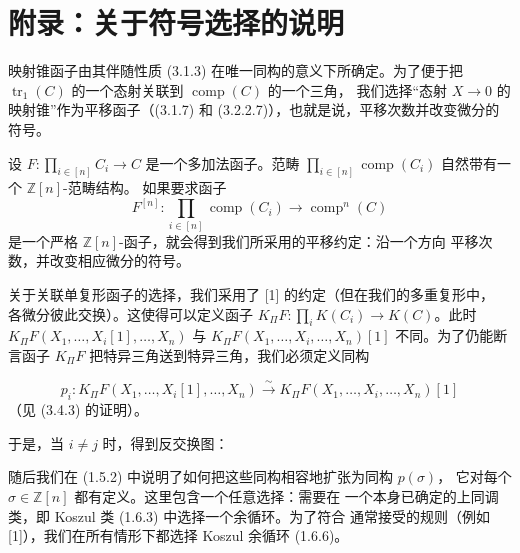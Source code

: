 \clearpage
{}%
\begingroup
\small
\setlength{\abovedisplayskip}{4pt plus 2pt minus 2pt}%
\setlength{\belowdisplayskip}{4pt plus 2pt minus 2pt}%

\section*{附录：关于符号选择的说明}

映射锥函子由其伴随性质 (3.1.3) 在唯一同构的意义下所确定。为了便于把
$\operatorname{tr}_1(C)$ 的一个态射关联到 $\operatorname{comp}(C)$ 的一个三角，
我们选择“态射 $X\longrightarrow 0$ 的映射锥”作为平移函子（(3.1.7) 和
(3.2.2.7)），也就是说，平移次数并改变微分的符号。

设 $F\colon\prod_{i\in[n]}C_i\longrightarrow C$ 是一个多加法函子。范畴
$\prod_{i\in[n]}\operatorname{comp}(C_i)$ 自然带有一个 $\mathbb Z[n]$-范畴结构。
如果要求函子
\[
  F^{[n]}\colon\prod_{i\in[n]}\operatorname{comp}(C_i)
  \longrightarrow\operatorname{comp}^{n}(C)
\]
是一个严格 $\mathbb Z[n]$-函子，就会得到我们所采用的平移约定：沿一个方向
平移次数，并改变相应微分的符号。

关于关联单复形函子的选择，我们采用了 [1] 的约定（但在我们的多重复形中，
各微分彼此交换）。这使得可以定义函子
$K_{\Pi}F\colon\prod_i K(C_i)\longrightarrow K(C)$。此时
$K_{\Pi}F(X_1,\ldots,X_i[1],\ldots,X_n)$ 与
$K_{\Pi}F(X_1,\ldots,X_i,\ldots,X_n)[1]$ 不同。为了仍能断言函子
$K_{\Pi}F$ 把特异三角送到特异三角，我们必须定义同构

\[
  p_i\colon K_{\Pi}F(X_1,\ldots,X_i[1],\ldots,X_n)
  \xrightarrow{\ \sim\ }
  K_{\Pi}F(X_1,\ldots,X_i,\ldots,X_n)[1]
\]
（见 (3.4.3) 的证明）。

于是，当 $i\ne j$ 时，得到反交换图：

\begin{center}
\end{center}

随后我们在 (1.5.2) 中说明了如何把这些同构相容地扩张为同构 $p(\sigma)$，
它对每个 $\sigma\in\mathbb Z[n]$ 都有定义。这里包含一个任意选择：需要在
一个本身已确定的上同调类，即 Koszul 类 (1.6.3) 中选择一个余循环。为了符合
通常接受的规则（例如 [1]），我们在所有情形下都选择 Koszul 余循环 (1.6.6)。
\endgroup
